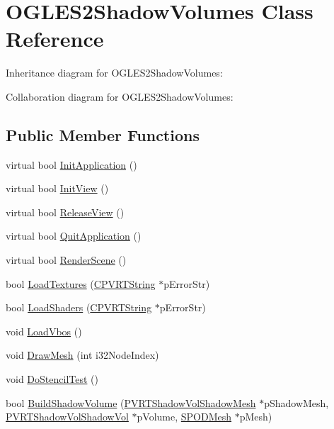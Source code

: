 \hypertarget{class_o_g_l_e_s2_shadow_volumes}{\section{O\+G\+L\+E\+S2\+Shadow\+Volumes Class Reference}
\label{class_o_g_l_e_s2_shadow_volumes}
}


Inheritance diagram for O\+G\+L\+E\+S2\+Shadow\+Volumes\+:


Collaboration diagram for O\+G\+L\+E\+S2\+Shadow\+Volumes\+:
\subsection*{Public Member Functions}
\begin{DoxyCompactItemize}
\item 
virtual bool \hyperlink{class_o_g_l_e_s2_shadow_volumes_a4c82ce83d1d71b87d73b6fcfb7122e51}{Init\+Application} ()
\item 
virtual bool \hyperlink{class_o_g_l_e_s2_shadow_volumes_a8b958a2eb2cb4b01f2b0c98d5868cb3f}{Init\+View} ()
\item 
virtual bool \hyperlink{class_o_g_l_e_s2_shadow_volumes_ab771e12238d4bea043725808a2dac166}{Release\+View} ()
\item 
virtual bool \hyperlink{class_o_g_l_e_s2_shadow_volumes_aff13cabe4e73ae5832a62a591296cefa}{Quit\+Application} ()
\item 
virtual bool \hyperlink{class_o_g_l_e_s2_shadow_volumes_a73abdb957998b90d498e8a8e73285f2e}{Render\+Scene} ()
\item 
bool \hyperlink{class_o_g_l_e_s2_shadow_volumes_a5bc1ed70daabc026d941b9172e0605e7}{Load\+Textures} (\hyperlink{class_c_p_v_r_t_string}{C\+P\+V\+R\+T\+String} $\ast$p\+Error\+Str)
\item 
bool \hyperlink{class_o_g_l_e_s2_shadow_volumes_aecbc385c797da473d863cd26c64ec9df}{Load\+Shaders} (\hyperlink{class_c_p_v_r_t_string}{C\+P\+V\+R\+T\+String} $\ast$p\+Error\+Str)
\item 
void \hyperlink{class_o_g_l_e_s2_shadow_volumes_a31c4d99434d3e5e679c80cde47f67918}{Load\+Vbos} ()
\item 
void \hyperlink{class_o_g_l_e_s2_shadow_volumes_a0ddfadec0069523e130d293433058e88}{Draw\+Mesh} (int i32\+Node\+Index)
\item 
void \hyperlink{class_o_g_l_e_s2_shadow_volumes_aced50c459c5486e4cef8e40cf23215f3}{Do\+Stencil\+Test} ()
\item 
bool \hyperlink{class_o_g_l_e_s2_shadow_volumes_acb41fbe23f37e4bc4f5ccc1a99b37b20}{Build\+Shadow\+Volume} (\hyperlink{struct_p_v_r_t_shadow_vol_shadow_mesh}{P\+V\+R\+T\+Shadow\+Vol\+Shadow\+Mesh} $\ast$p\+Shadow\+Mesh, \hyperlink{struct_p_v_r_t_shadow_vol_shadow_vol}{P\+V\+R\+T\+Shadow\+Vol\+Shadow\+Vol} $\ast$p\+Volume, \hyperlink{struct_s_p_o_d_mesh}{S\+P\+O\+D\+Mesh} $\ast$p\+Mesh)

\end{DoxyCompactItemize}
